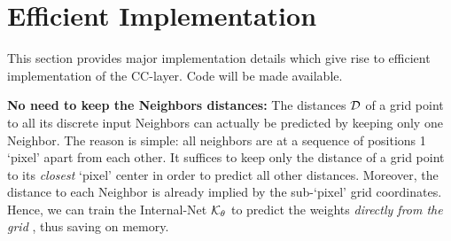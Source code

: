 \section{Efficient Implementation}
\vspace{-0.3cm}
\label{sec:efficiency}
This section provides major implementation details which give rise to efficient implementation of the CC-layer. Code will be made available.

\textbf{No need to keep the Neighbors distances:} The distances $\textcolor{black}{\mathcal{D}}$  of a grid point    to all its discrete input Neighbors can actually be predicted by keeping only one Neighbor. The reason is simple: all neighbors are at a sequence of positions 1 `pixel' apart from each other. 
It suffices to keep only the distance of a grid point to its \emph{closest} `pixel' center in order to predict all other distances. Moreover, the distance to each Neighbor is already implied by the sub-`pixel' grid coordinates. Hence, we can train the Internal-Net
$\textcolor{black}{\mathcal{K}_\theta}$  to predict the weights \emph{directly from the grid} , thus saving on memory. 


